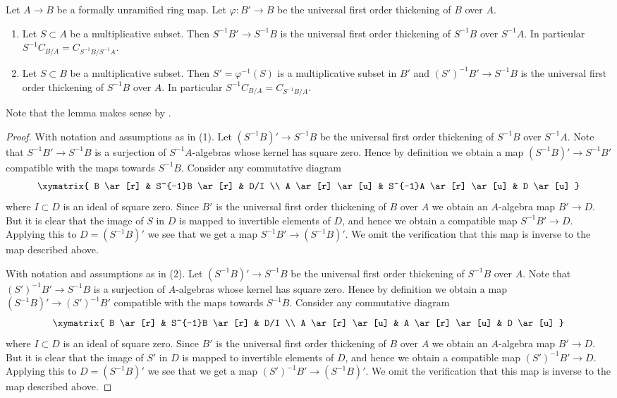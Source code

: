 \begin{lemma}
\label{lemma-universal-thickening-localize}
Let $A \to B$ be a formally unramified ring map.
Let $\varphi : B' \to B$ be the universal first order thickening of
$B$ over $A$.
\begin{enumerate}
\item Let $S \subset A$ be a multiplicative subset.
Then $S^{-1}B' \to S^{-1}B$ is the universal first order thickening of
$S^{-1}B$ over $S^{-1}A$. In particular $S^{-1}C_{B/A} = C_{S^{-1}B/S^{-1}A}$.
\item Let $S \subset B$ be a multiplicative subset.
Then $S' = \varphi^{-1}(S)$ is a multiplicative subset in $B'$
and $(S')^{-1}B' \to S^{-1}B$ is the universal first order thickening
of $S^{-1}B$ over $A$. In particular $S^{-1}C_{B/A} = C_{S^{-1}B/A}$.
\end{enumerate}
Note that the lemma makes sense by
.
\end{lemma}

\begin{proof}
With notation and assumptions as in (1). Let $(S^{-1}B)' \to S^{-1}B$
be the universal first order thickening of $S^{-1}B$ over $S^{-1}A$.
Note that $S^{-1}B' \to S^{-1}B$ is a surjection of $S^{-1}A$-algebras
whose kernel has square zero. Hence by definition we obtain a map
$(S^{-1}B)' \to S^{-1}B'$ compatible with the maps towards $S^{-1}B$.
Consider any commutative diagram
$$
\xymatrix{
B \ar[r] & S^{-1}B \ar[r] & D/I \\
A \ar[r] \ar[u] & S^{-1}A \ar[r] \ar[u] & D \ar[u]
}
$$
where $I \subset D$ is an ideal of square zero. Since $B'$ is the universal
first order thickening of $B$ over $A$ we obtain an $A$-algebra map
$B' \to D$. But it is clear that the image of $S$ in $D$ is mapped to
invertible elements of $D$, and hence we obtain a compatible map
$S^{-1}B' \to D$. Applying this to $D = (S^{-1}B)'$ we see that we get
a map $S^{-1}B' \to (S^{-1}B)'$. We omit the verification that this map
is inverse to the map described above.

\medskip\noindent
With notation and assumptions as in (2). Let $(S^{-1}B)' \to S^{-1}B$
be the universal first order thickening of $S^{-1}B$ over $A$.
Note that $(S')^{-1}B' \to S^{-1}B$ is a surjection of $A$-algebras
whose kernel has square zero. Hence by definition we obtain a map
$(S^{-1}B)' \to (S')^{-1}B'$ compatible with the maps towards $S^{-1}B$.
Consider any commutative diagram
$$
\xymatrix{
B \ar[r] & S^{-1}B \ar[r] & D/I \\
A \ar[r] \ar[u] & A \ar[r] \ar[u] & D \ar[u]
}
$$
where $I \subset D$ is an ideal of square zero. Since $B'$ is the universal
first order thickening of $B$ over $A$ we obtain an $A$-algebra map
$B' \to D$. But it is clear that the image of $S'$ in $D$ is mapped to
invertible elements of $D$, and hence we obtain a compatible map
$(S')^{-1}B' \to D$. Applying this to $D = (S^{-1}B)'$ we see that we get
a map $(S')^{-1}B' \to (S^{-1}B)'$. We omit the verification that this map
is inverse to the map described above.
\end{proof}

